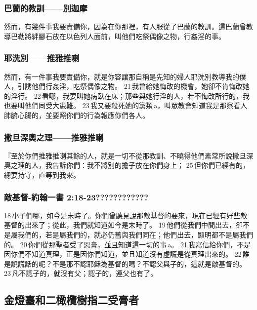 \subsubsection{巴蘭的教訓——別迦摩}
 然而，有幾件事我要責備你，因為在你那裡，有人服從了巴蘭的教訓。這巴蘭曾教導巴勒將絆腳石放在以色列人面前，叫他們吃祭偶像之物，行姦淫的事。
 
 \subsubsection{耶洗別——推雅推喇}
 然而，有一件事我要責備你，就是你容讓那自稱是先知的婦人耶洗別教導我的僕人，引誘他們行姦淫，吃祭偶像之物。 21 我曾給她悔改的機會，她卻不肯悔改她的淫行。 22 看哪，我要叫她病臥在床；那些與她行淫的人，若不悔改所行的，我也要叫他們同受大患難。 23 我又要殺死她的黨類 a，叫眾教會知道我是那察看人肺腑心腸的，並要照你們的行為報應你們各人。
 
 \subsubsection{撒旦深奧之理——推雅推喇} 
 『至於你們推雅推喇其餘的人，就是一切不從那教訓、不曉得他們素常所說撒旦深奧之理的人，我告訴你們：我不將別的擔子放在你們身上； 25 但你們已經有的，總要持守，直等到我來。
 
 \subsubsection{敵基督-約翰一書 2:18-23????????????} 
18 小子們哪，如今是末時了。你們曾聽見說那敵基督的要來，現在已經有好些敵基督的出來了；從此，我們就知道如今是末時了。 19 他們從我們中間出去，卻不是屬我們的，若是屬我們的，就必仍舊與我們同在；他們出去，顯明都不是屬我們的。 20 你們從那聖者受了恩膏，並且知道這一切的事 a。 21 我寫信給你們，不是因你們不知道真理，正是因你們知道，並且知道沒有虛謊是從真理出來的。 22 誰是說謊話的呢？不是那不認耶穌為基督的嗎？不認父與子的，這就是敵基督的。 23 凡不認子的，就沒有父；認子的，連父也有了。







\subsection{金燈臺和二橄欖樹指二受膏者}

